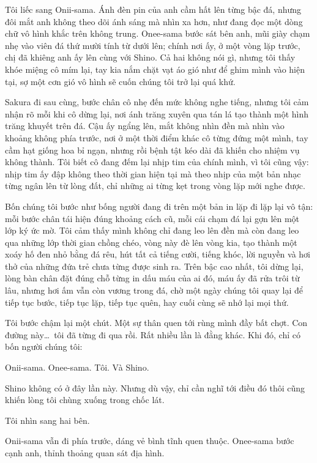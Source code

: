 \documentclass[../main.tex]{subfiles}
\begin{document}
Tôi liếc sang Onii-sama. Ánh đèn pin của anh cầm hất lên từng bậc đá, nhưng đôi mắt anh không theo dõi ánh sáng mà nhìn xa hơn, như đang đọc một dòng chữ vô hình khắc trên không trung. Onee-sama bước sát bên anh, mũi giày chạm nhẹ vào viên đá thứ mười tính từ dưới lên; chính nơi ấy, ở một vòng lặp trước, chị đã khiêng anh ấy lên cùng với Shino. Cả hai không nói gì, nhưng tôi thấy khóe miệng cô mím lại, tay kia nắm chặt vạt áo gió như để ghim mình vào hiện tại, sợ một cơn gió vô hình sẽ cuốn chúng tôi trở lại quá khứ.

Sakura đi sau cùng, bước chân cô nhẹ đến mức không nghe tiếng, nhưng tôi cảm nhận rõ mỗi khi cô dừng lại, nơi ánh trăng xuyên qua tán lá tạo thành một hình trăng khuyết trên đá. Cậu ấy ngẩng lên, mắt không nhìn đền mà nhìn vào khoảng không phía trước, nơi ở một thời điểm khác cô từng đứng một mình, tay cầm hạt giống hoa bỉ ngạn, nhưng rồi bệnh tật kéo dài đã khiến cho nhiệm vụ không thành. Tôi biết cô đang đếm lại nhịp tim của chính mình, vì tôi cũng vậy: nhịp tim ấy đập không theo thời gian hiện tại mà theo nhịp của một bản nhạc từng ngân lên từ lòng đất, chỉ những ai từng kẹt trong vòng lặp mới nghe được.

Bốn chúng tôi bước như bống người đang đi trên một bản in lặp đi lặp lại vô tận: mỗi bước chân tái hiện đúng khoảng cách cũ, mỗi cái chạm đá lại gợn lên một lớp ký ức mờ. Tôi cảm thấy mình không chỉ đang leo lên đền mà còn đang leo qua những lớp thời gian chồng chéo, vòng này đè lên vòng kia, tạo thành một xoáy hố đen nhỏ bằng đá rêu, hút tất cả tiếng cười, tiếng khóc, lời nguyền và hơi thở của những đứa trẻ chưa từng được sinh ra. Trên bậc cao nhất, tôi dừng lại, lòng bàn chân đặt đúng chỗ từng in dấu máu của ai đó, máu ấy đã rửa trôi từ lâu, nhưng hơi ấm vẫn còn vương trong đá, chờ một ngày chúng tôi quay lại để tiếp tục bước, tiếp tục lặp, tiếp tục quên, hay cuối cùng sẽ nhớ lại mọi thứ.

Tôi bước chậm lại một chút. Một sự thân quen tới rùng mình đầy bất chợt. Con đường này\dots\ tôi đã từng đi qua rồi. Rất nhiều lần là đằng khác. Khi đó, chỉ có bốn người chúng tôi:

Onii-sama. Onee-sama. Tôi. Và Shino.

Shino không có ở đây lần này. Nhưng dù vậy, chỉ cần nghĩ tới điều đó thôi cũng khiến lòng tôi chùng xuống trong chốc lát.

Tôi nhìn sang hai bên.

Onii-sama vẫn đi phía trước, dáng vẻ bình tĩnh quen thuộc. Onee-sama bước cạnh anh, thỉnh thoảng quan sát địa hình.
\end{document}
